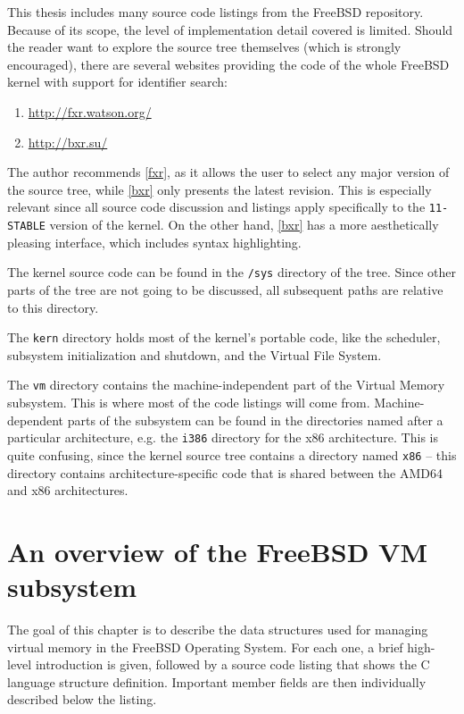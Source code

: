 \documentclass[shortabstract, english]{iithesis}
\begin{document}
This thesis includes many source code listings from the FreeBSD repository.
Because of its scope, the level of implementation detail covered is limited.
Should the reader want to explore the source tree themselves (which is strongly
encouraged), there are several websites providing the code of the whole FreeBSD
kernel with support for identifier search:
\begin{enumerate}[label=\textnormal{(\arabic*)}]
\item \url{http://fxr.watson.org/}\label{fxr}
\item \url{http://bxr.su/}\label{bxr}
\end{enumerate}

The author recommends \ref{fxr}, as it allows the user to select any major
version of the source tree, while \ref{bxr} only presents the latest revision.
This is especially relevant since all source code discussion and listings apply
specifically to the \texttt{11-STABLE} version of the kernel. On the other hand,
\ref{bxr} has a more aesthetically pleasing interface, which includes syntax
highlighting.

The kernel source code can be found in the \texttt{/sys} directory of the tree.
Since other parts of the tree are not going to be discussed, all subsequent
paths are relative to this directory.

The \texttt{kern} directory holds most of the kernel's portable code, like the
scheduler, subsystem initialization and shutdown, and the Virtual File System.

The \texttt{vm} directory contains the machine-independent part of the Virtual
Memory subsystem. This is where most of the code listings will come from.
Machine-dependent parts of the subsystem can be found in the directories named
after a particular architecture, e.g. the \texttt{i386} directory for the x86
architecture. This is quite confusing, since the kernel source tree contains a
directory named \texttt{x86} -- this directory contains architecture-specific
code that is shared between the AMD64 and x86 architectures.

\chapter{An overview of the FreeBSD VM subsystem}

The goal of this chapter is to describe the data structures used for managing
virtual memory in the FreeBSD Operating System. For each one, a brief high-level
introduction is given, followed by a source code listing that shows the C
language structure definition. Important member fields are then individually
described below the listing.
\end{document}
